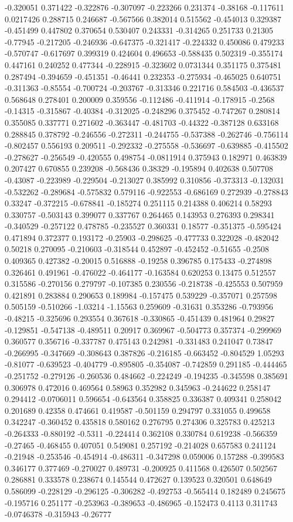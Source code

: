 -0.320051 0.371422 -0.322876 -0.307097 -0.223266 0.231374 -0.38168 -0.117611 0.0217426 0.288715 0.246687 -0.567566 0.382014 0.515562 -0.454013 0.329387 -0.451499 0.447802 0.370654 0.530407 0.243331 -0.314265 0.251733 0.21305 -0.77945 -0.217205 -0.246936 -0.647375 -0.321417 -0.224332 0.450086 0.479233 -0.570747 -0.617697 0.399319 0.424604 0.496653 -0.588435 0.502319 -0.355174 0.447161 0.240252 0.477344 -0.228915 -0.323602 0.0731344 0.351175 0.375481 0.287494 -0.394659 -0.451351 -0.46441 0.232353 -0.275934 -0.465025 0.640751 -0.311363 -0.85554 -0.700724 -0.203767 -0.313346 0.221716 0.584503 -0.436537 0.568648 0.278401 0.200009 0.359556 -0.112486 -0.411914 -0.178915 -0.2568 -0.14315 -0.315867 -0.40384 -0.312025 -0.248296 0.375452 -0.747267 0.280814 0.355085 0.337771 0.271602 -0.363447 -0.481703 -0.44322 -0.387128 0.633168 0.288845 0.378792 -0.246556 -0.272311 -0.244755 -0.537388 -0.262746 -0.756114 -0.802457 0.556193 0.209511 -0.292332 -0.275558 -0.536697 -0.639885 -0.415502 -0.278627 -0.256549 -0.420555 0.498754 -0.0811914 0.375943 0.182971 0.463839 0.207427 0.670855 0.239208 -0.568436 0.38329 -0.195894 0.402638 0.507708 -0.43087 -0.223989 -0.229504 -0.213027 0.385992 0.310856 -0.373313 -0.132031 -0.532262 -0.289684 -0.575832 0.579116 -0.922553 -0.686169 0.272939 -0.278843 0.33247 -0.372215 -0.678841 -0.185274 0.251115 0.214388 0.406214 0.58293 0.330757 -0.503143 0.399077 0.337767 0.264465 0.143953 0.276393 0.298341 -0.340529 -0.257122 0.478785 -0.235527 0.360331 0.18577 -0.351375 -0.595424 0.471894 0.372377 0.193172 -0.25903 -0.298625 -0.477733 0.322028 -0.482042 0.50218 0.270095 -0.210603 -0.318544 0.452897 -0.452452 -0.51655 -0.2508 0.409365 0.427382 -0.20015 0.516888 -0.19258 0.396785 0.175433 -0.274898 0.326461 0.491961 -0.476022 -0.464177 -0.163584 0.620253 0.13475 0.512557 0.315586 -0.270156 0.279797 -0.107385 0.230556 -0.218738 -0.425553 0.507959 0.421891 0.283884 0.290653 0.189984 -0.157475 0.539229 -0.357071 0.257598 0.505159 -0.510266 -1.03214 -1.15563 0.259609 -0.31631 0.353286 -0.793956 -0.48215 -0.325696 0.293554 0.367618 -0.330865 -0.451439 0.481964 0.29827 -0.129851 -0.547138 -0.489511 0.20917 0.369967 -0.504773 0.357374 -0.299969 0.360577 0.356716 -0.337787 0.475143 0.242981 -0.331483 0.241047 0.73847 -0.266995 -0.347669 -0.308643 0.387826 -0.216185 -0.663452 -0.804529 1.05293 -0.81077 -0.639523 -0.404779 -0.895805 -0.354087 -0.742859 0.291185 -0.444465 -0.251752 -0.279126 -0.260536 0.484662 -0.224249 -0.194235 -0.345598 0.385691 0.306978 0.472016 0.469564 0.58963 0.352982 0.345963 -0.244622 0.258147 0.294412 -0.0706011 0.596654 -0.643564 0.358825 0.336387 0.409341 0.258042 0.201689 0.42358 0.474661 0.419587 -0.501159 0.294797 0.331055 0.499658 0.342247 -0.360452 0.435818 0.580162 0.276795 0.274306 0.325783 0.425213 -0.264333 -0.880192 -0.5311 -0.224414 0.362108 0.330784 0.619238 -0.566359 -0.27465 -0.468455 0.407051 0.549081 0.257192 -0.214028 0.657583 0.241124 -0.21948 -0.253546 -0.454914 -0.486311 -0.347298 0.059006 0.157288 -0.399583 0.346177 0.377469 -0.270027 0.489731 -0.200925 0.411568 0.426507 0.502567 0.286881 0.333578 0.238674 0.145544 0.472627 0.139523 0.320501 0.648649 0.586099 -0.228129 -0.296125 -0.306282 -0.492753 -0.565414 0.182489 0.245675 -0.195716 0.251177 -0.253963 -0.389653 -0.486965 -0.152473 0.4113 0.311743 -0.0746378 -0.315943 -0.26777 